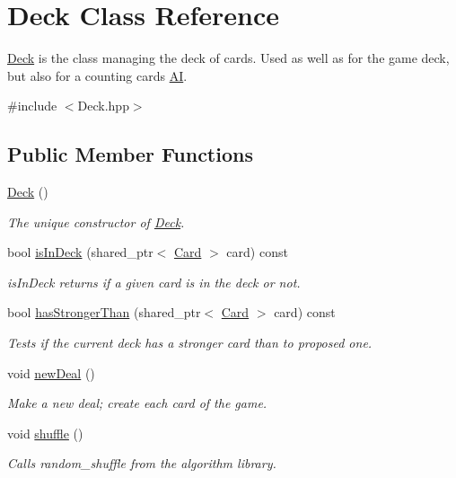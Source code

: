 \hypertarget{classDeck}{\section{\-Deck \-Class \-Reference}
\label{classDeck}
}


\hyperlink{classDeck}{\-Deck} is the class managing the deck of cards. \-Used as well as for the game deck, but also for a counting cards \hyperlink{classAI}{\-A\-I}.  




{\ttfamily \#include $<$\-Deck.\-hpp$>$}

\subsection*{\-Public \-Member \-Functions}
\begin{DoxyCompactItemize}
\item 
\hypertarget{classDeck_a57ae1cb4ac6fd61c249cefb2db85eb99}{\hyperlink{classDeck_a57ae1cb4ac6fd61c249cefb2db85eb99}{\-Deck} ()}\label{classDeck_a57ae1cb4ac6fd61c249cefb2db85eb99}

\begin{DoxyCompactList}\small\item\em \-The unique constructor of \hyperlink{classDeck}{\-Deck}. \end{DoxyCompactList}\item 
bool \hyperlink{classDeck_aaafdac9dd57ada20cc78dd330c741963}{is\-In\-Deck} (shared\-\_\-ptr$<$ \hyperlink{classCard}{\-Card} $>$ card) const 
\begin{DoxyCompactList}\small\item\em is\-In\-Deck returns if a given card is in the deck or not. \end{DoxyCompactList}\item 
bool \hyperlink{classDeck_a82a3371b10b8be7bc5fef6999a56bb88}{has\-Stronger\-Than} (shared\-\_\-ptr$<$ \hyperlink{classCard}{\-Card} $>$ card) const 
\begin{DoxyCompactList}\small\item\em \-Tests if the current deck has a stronger card than to proposed one. \end{DoxyCompactList}\item 
\hypertarget{classDeck_aec4d8d2a67f1c46a1a7f175b8848f5b6}{void \hyperlink{classDeck_aec4d8d2a67f1c46a1a7f175b8848f5b6}{new\-Deal} ()}\label{classDeck_aec4d8d2a67f1c46a1a7f175b8848f5b6}

\begin{DoxyCompactList}\small\item\em \-Make a new deal; create each card of the game. \end{DoxyCompactList}\item 
\hypertarget{classDeck_ae5a1e52ab00ae5924f2bc6b730dba3eb}{void \hyperlink{classDeck_ae5a1e52ab00ae5924f2bc6b730dba3eb}{shuffle} ()}\label{classDeck_ae5a1e52ab00ae5924f2bc6b730dba3eb}

\begin{DoxyCompactList}\small\item\em \-Calls random\-\_\-shuffle from the algorithm library. \end{DoxyCompactList}\end{DoxyCompactItemize}

